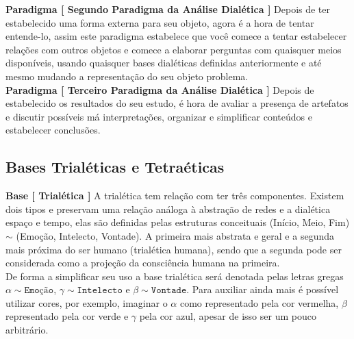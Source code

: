 \documentclass[10pt,a4paper]{report}
\begin{document}
\textbf{Paradigma [ Segundo Paradigma da Análise Dialética ]} Depois de ter estabelecido uma forma externa para seu objeto, agora é a hora de tentar entende-lo, assim este paradigma estabelece que você comece a tentar estabelecer relações com outros objetos e comece a elaborar perguntas com quaisquer meios disponíveis, usando quaisquer bases dialéticas definidas anteriormente e até mesmo mudando a representação do seu objeto problema. \\

\textbf{Paradigma [ Terceiro Paradigma da Análise Dialética ]} Depois de estabelecido os resultados do seu estudo, é hora de avaliar a presença de artefatos e discutir possíveis má interpretações, organizar e simplificar conteúdos e estabelecer conclusões.


\subsection{Bases Trialéticas e Tetraéticas}

\hspace{\baselineskip}

\textbf{Base [ Trialética ]} A trialética tem relação com ter três componentes. Existem dois tipos e preservam uma relação análoga à abstração de redes e a dialética espaço e tempo, elas são definidas pelas estruturas conceituais (Início, Meio, Fim) $\sim$ (Emoção, Intelecto, Vontade). A primeira mais abstrata e geral e a segunda mais próxima do ser humano (trialética humana), sendo que a segunda pode ser considerada como a projeção da consciência humana na primeira. \\


De forma a simplificar seu uso a base trialética será denotada pelas letras gregas $\alpha \sim \texttt{Emoção}$, $\gamma \sim \texttt{Intelecto}$ e $\beta \sim \texttt{Vontade}$. Para auxiliar ainda mais é possível utilizar cores, por exemplo, imaginar o $\alpha$ como representado pela cor vermelha, $\beta$ representado pela cor verde e $\gamma$ pela cor azul, apesar de isso ser um pouco arbitrário. \\
\end{document}
